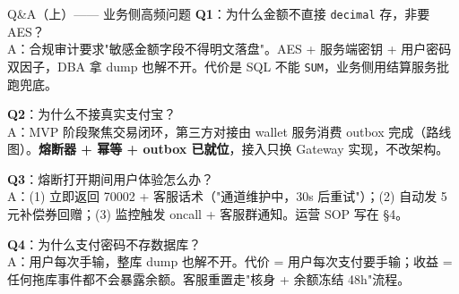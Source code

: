 \documentclass[aspectratio=169,11pt]{beamer}
\begin{document}
\appendix

\begin{frame}[shrink]{Q\&A（上）—— 业务侧高频问题}
\small
\textbf{Q1}：为什么金额不直接 \texttt{decimal} 存，非要 AES？\\
\hspace{4mm} A：合规审计要求"敏感金额字段不得明文落盘"。AES + 服务端密钥 + 用户密码双因子，DBA 拿 dump 也解不开。代价是 SQL 不能 \texttt{SUM}，业务侧用结算服务批跑兜底。

\vspace{1mm}
\textbf{Q2}：为什么不接真实支付宝？\\
\hspace{4mm} A：MVP 阶段聚焦交易闭环，第三方对接由 wallet 服务消费 outbox 完成（路线图）。\textbf{熔断器 + 幂等 + outbox 已就位}，接入只换 Gateway 实现，不改架构。

\vspace{1mm}
\textbf{Q3}：熔断打开期间用户体验怎么办？\\
\hspace{4mm} A：(1) 立即返回 70002 + 客服话术（"通道维护中，30s 后重试"）；(2) 自动发 5 元补偿券回赠；(3) 监控触发 oncall + 客服群通知。运营 SOP 写在 §4。

\vspace{1mm}
\textbf{Q4}：为什么支付密码不存数据库？\\
\hspace{4mm} A：用户每次手输，整库 dump 也解不开。代价 = 用户每次支付要手输；收益 = 任何拖库事件都不会暴露余额。客服重置走"核身 + 余额冻结 48h"流程。
\end{frame}
\end{document}
